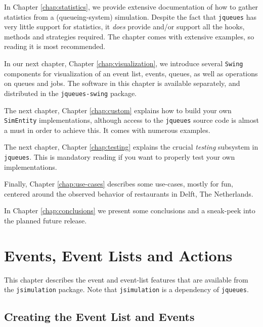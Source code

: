 \documentclass[12pt]{book}
\begin{document}
In Chapter \ref{chap:statistics},
  we provide extensive documentation
  of how to gather statistics from a
  (queueing-system) simulation.
Despite the fact that
  \lstinline|jqueues| has very little
  support for statistics,
  it {\em does\/} provide and/or support
  all the hooks, methods
  and strategies required.
The chapter comes with extensive examples,
  so reading it is most recommended.

In our next chapter, Chapter \ref{chap:visualization},
  we introduce several \lstinline|Swing| components
  for visualization of
  an event list, events, queues,
  as well as operations on queues and jobs.
The software in this chapter is available
  separately,
  and distributed in the \lstinline|jqueues-swing|
  package.

The next chapter,
  Chapter \ref{chap:custom}
  explains how to build your own
  \lstinline|SimEntity|
  implementations,
  although access to the \lstinline|jqueues|
  source code is almost a must in order to achieve this.
It comes with numerous examples.

The next chapter,
  Chapter \ref{chap:testing}
  explains the crucial {\em testing\/}
  subsystem in \lstinline|jqueues|.
This is mandatory reading if you want to
  properly test your own implementations.

Finally,
  Chapter \ref{chap:use-cases}
  describes some use-cases,
  mostly for fun,
  centered around the observed
  behavior of restaurants
  in Delft, The Netherlands.

In Chapter \ref{chap:conclusions}
  we present some conclusions
  and a sneak-peek into
  the planned future release.

\chapter{Events, Event Lists and Actions}
\label{sec:events-eventlists-actions}

This chapter describes the event and event-list features
  that are available from the \lstinline{jsimulation} package.
Note that \lstinline{jsimulation} is a dependency of \lstinline{jqueues}.

\section{Creating the Event List and Events}
\end{document}
